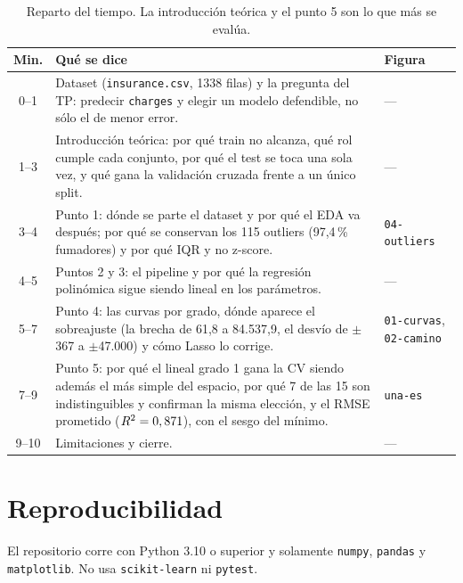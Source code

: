 \documentclass[11pt,a4paper]{article}
\begin{document}
\begin{table}[H]
\centering
\small
\caption{Reparto del tiempo. La introducción teórica y el punto 5 son lo que más se evalúa.}
\begin{tabular}{@{}c p{9.6cm} p{3.3cm}@{}}
\toprule
\textbf{Min.} & \textbf{Qué se dice} & \textbf{Figura} \\
\midrule
0--1 & Dataset (\texttt{insurance.csv}, 1338 filas) y la pregunta del TP: predecir \texttt{charges} y elegir un modelo defendible, no sólo el de menor error. & --- \\
1--3 & Introducción teórica: por qué train no alcanza, qué rol cumple cada conjunto, por qué el test se toca una sola vez, y qué gana la validación cruzada frente a un único split. & --- \\
3--4 & Punto 1: dónde se parte el dataset y por qué el EDA va después; por qué se conservan los 115 outliers (97,4\,\% fumadores) y por qué IQR y no z-score. & \texttt{04-outliers} \\
4--5 & Puntos 2 y 3: el pipeline y por qué la regresión polinómica sigue siendo lineal en los parámetros. & --- \\
5--7 & Punto 4: las curvas por grado, dónde aparece el sobreajuste (la brecha de 61,8 a 84.537,9, el desvío de $\pm$367 a $\pm$47.000) y cómo Lasso lo corrige. & \texttt{01-curvas}, \texttt{02-camino} \\
7--9 & Punto 5: por qué el lineal grado 1 gana la CV siendo además el más simple del espacio, por qué 7 de las 15 son indistinguibles y confirman la misma elección, y el RMSE prometido ($R^2 = 0,871$), con el sesgo del mínimo. & \texttt{una-es} \\
9--10 & Limitaciones y cierre. & --- \\
\bottomrule
\end{tabular}
\end{table}

\appendix
\section{Reproducibilidad}

El repositorio corre con Python 3.10 o superior y solamente \texttt{numpy}, \texttt{pandas} y
\texttt{matplotlib}. No usa \texttt{scikit-learn} ni \texttt{pytest}.
\end{document}
